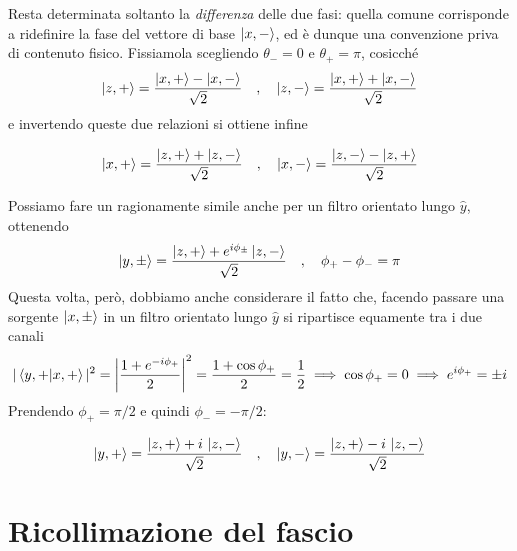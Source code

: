 Resta determinata soltanto la \emph{differenza} delle due fasi: quella comune corrisponde a ridefinire la fase del vettore di base $\ket{x,-}$, ed è dunque una convenzione priva di contenuto fisico. Fissiamola scegliendo $\theta_- = 0$ e $\theta_+ = \pi$, cosicché
%
\begin{equation}
\label{eq:relazioni_z_x}
    \ket{z,+} = \frac{\ket{x,+} - \ket{x,-}}{\sqrt{2}} \quad , \quad \ket{z,-} = \frac{\ket{x,+} + \ket{x,-}}{\sqrt{2}}
\end{equation}
%
e invertendo queste due relazioni si ottiene infine
%
\begin{tcolorbox}[colback=black!5!white, colframe=black!45!white, boxrule=0.8pt]
\begin{equation}
    \label{eq:base-x}
    \ket{x, +} = \frac{\ket{z, +} + \ket{z, -}}{\sqrt{2}}\quad , \quad \ket{x, -} = \frac{\ket{z, -} - \ket{z, +}}{\sqrt{2}}
\end{equation}
\end{tcolorbox}

Possiamo fare un ragionamente simile anche per un filtro orientato lungo $\hat{y}$, ottenendo 
\begin{equation*}
    \ket{y, \pm} = \frac{\ket{z,+} + e^{i\phi_{\pm}}\ket{z,-}}{\sqrt{2}} \quad , \quad \phi_+ - \phi_- = \pi
\end{equation*}
Questa volta, però, dobbiamo anche considerare il fatto che, facendo passare una sorgente $\ket{x, \pm}$ in un filtro orientato lungo $\hat{y}$ si ripartisce equamente tra i due canali
\begin{equation*}
    |\braket{y,+|x,+}|^2=\left|\frac{1+e^{-i\phi_+}}{2}\right|^2=\frac{1+\cos\phi_+}{2}=\frac12 \implies \cos\phi_+=0 \implies e^{i\phi_+}=\pm i
\end{equation*}
Prendendo $\phi_+=\pi/2$ e quindi $\phi_-=-\pi/2$:
\begin{tcolorbox}[colback=black!5!white, colframe=black!45!white, boxrule=0.8pt]
\begin{equation}
    \ket{y,+}=\frac{\ket{z,+} + i\,\ket{z,-}}{\sqrt2} \quad , \quad \ket{y,-}=\frac{\ket{z,+} - i\,\ket{z,-}}{\sqrt2}
\end{equation}
\end{tcolorbox}

\newpage

\section{Ricollimazione del fascio}

